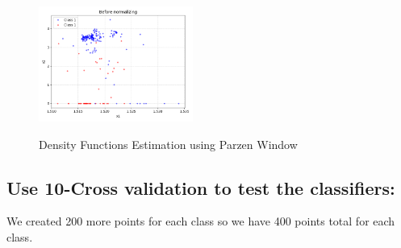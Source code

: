 \documentclass[11pt, oneside]{article}   	%
\begin{document}
\begin{figure}
\begin{center}
{	\includegraphics[width=0.45\textwidth]{plots/data-before-norm.png}
	\label{absorbing}
	}
\end{center}
\caption{Density Functions Estimation using Parzen Window}
\end{figure}


\subsection{Use 10-Cross validation to test the classifiers:}
We created 200 more points for each class so we have 400 points total for each class.\\
\end{document}
